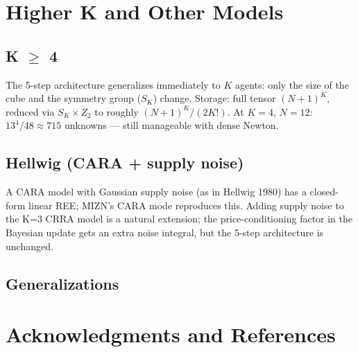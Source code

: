 \documentclass[11pt,oneside]{book}
\theoremstyle{definition}
\begin{document}
\begin{tcolorbox}[title=\textbf{CRRA market-clearing bisection (matches \texttt{crra\_clear\_nb} in MIZN)},
                    colback=gray!5, colframe=black]
\begin{tcolorbox}[title=\textbf{Coefficients $\leftrightarrow$ values at
Lobatto nodes}, colback=gray!5, colframe=black]
\begin{tcolorbox}[title=\textbf{Dense Newton (MIZN \texttt{solvers/dense\_newton.py})},
                    colback=gray!5, colframe=black]
\chapter{Higher K and Other Models}

\section{K $\ge$ 4}

The 5-step architecture generalizes immediately to $K$ agents: only the
size of the cube and the symmetry group ($S_K$) change. Storage: full
tensor $(N+1)^K$, reduced via $S_K \times Z_2$ to roughly $(N+1)^K / (2 K!)$.
At $K = 4$, $N = 12$: $13^4 / 48 \approx 715$ unknowns --- still manageable
with dense Newton.

\section{Hellwig (CARA + supply noise)}

A CARA model with Gaussian supply noise (as in Hellwig 1980) has a
closed-form linear REE; MIZN's CARA mode reproduces this. Adding supply
noise to the K=3 CRRA model is a natural extension; the price-conditioning
factor in the Bayesian update gets an extra noise integral, but the
5-step architecture is unchanged.

\section{Generalizations}


\chapter*{Acknowledgments and References}


\end{tcolorbox}
\end{tcolorbox}
\end{tcolorbox}
\end{document}
